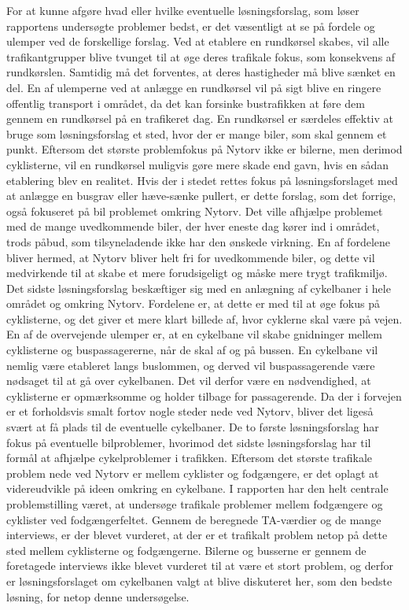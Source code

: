 For at kunne afgøre hvad eller hvilke eventuelle løsningsforslag, som løser rapportens undersøgte problemer bedst, er det væsentligt at se på fordele og ulemper ved de forskellige forslag. Ved at etablere en rundkørsel skabes, vil alle trafikantgrupper blive tvunget til at øge deres trafikale fokus, som konsekvens af rundkørslen. Samtidig må det forventes, at deres hastigheder må blive sænket en del. En af ulemperne ved at anlægge en rundkørsel vil på sigt blive en ringere offentlig transport i området, da det kan forsinke bustrafikken at føre dem gennem en rundkørsel på en trafikeret dag. En rundkørsel er særdeles effektiv at bruge som løsningsforslag et sted, hvor der er mange biler, som skal gennem et punkt. Eftersom det største problemfokus på Nytorv ikke er bilerne, men derimod cyklisterne, vil en rundkørsel muligvis gøre mere skade end gavn, hvis en sådan etablering blev en realitet.
Hvis der i stedet rettes fokus på løsningsforslaget med at anlægge en busgrav eller hæve-sænke pullert, er dette forslag, som det forrige, også fokuseret på bil problemet omkring Nytorv. Det ville afhjælpe problemet med de mange uvedkommende biler, der hver eneste dag kører ind i området, trods påbud, som tilsyneladende ikke har den ønskede virkning. En af fordelene bliver hermed, at Nytorv bliver helt fri for uvedkommende biler, og dette vil medvirkende til at skabe et mere forudsigeligt og måske mere trygt trafikmiljø.
Det sidste løsningsforslag beskæftiger sig med en anlægning af cykelbaner i hele området og omkring Nytorv. Fordelene er, at dette er med til at øge fokus på cyklisterne, og det giver et mere klart billede af, hvor cyklerne skal være på vejen. En af de overvejende ulemper er, at en cykelbane vil skabe gnidninger mellem cyklisterne og buspassagererne, når de skal af og på bussen. En cykelbane vil nemlig være etableret langs buslommen, og derved vil buspassagerende være nødsaget til at gå over cykelbanen. Det vil derfor være en nødvendighed, at cyklisterne er opmærksomme og holder tilbage for passagerende.
Da der i forvejen er et forholdsvis smalt fortov nogle steder nede ved Nytorv, bliver det ligeså svært at få plads til de eventuelle cykelbaner. De to første løsningsforslag har fokus på eventuelle bilproblemer, hvorimod det sidste løsningsforslag har til formål at afhjælpe cykelproblemer i trafikken. Eftersom det største trafikale problem nede ved Nytorv er mellem cyklister og fodgængere, er det oplagt at videreudvikle på ideen omkring en cykelbane.
I rapporten har den helt centrale problemstilling været, at undersøge trafikale problemer mellem fodgængere og cyklister ved fodgængerfeltet. Gennem de beregnede TA-værdier og de mange interviews, er der blevet vurderet, at der er et trafikalt problem netop på dette sted mellem cyklisterne og fodgængerne. Bilerne og busserne er gennem de foretagede interviews ikke blevet vurderet til at være et stort problem, og derfor er løsningsforslaget om cykelbanen valgt at blive diskuteret her, som den bedste løsning, for netop denne undersøgelse.
